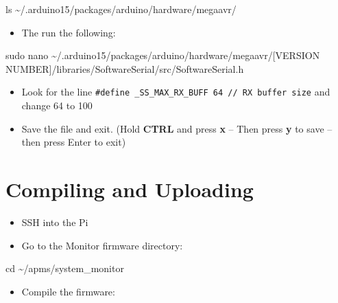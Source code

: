 \documentclass[
  letterpaper,
]{scrbook}
\newenvironment{Shaded}{\begin{snugshade}}{\end{snugshade}}
\newcommand{\BuiltInTok}[1]{\textcolor[rgb]{0.00,0.23,0.31}{#1}}
\newcommand{\FunctionTok}[1]{\textcolor[rgb]{0.28,0.35,0.67}{#1}}
\newcommand{\NormalTok}[1]{\textcolor[rgb]{0.00,0.23,0.31}{#1}}
\providecommand{\tightlist}{%
  \setlength{\itemsep}{0pt}\setlength{\parskip}{0pt}}
\begin{document}
\begin{Shaded}
\begin{Highlighting}[]
\FunctionTok{ls}\NormalTok{ \textasciitilde{}/.arduino15/packages/arduino/hardware/megaavr/}
\end{Highlighting}
\end{Shaded}

\begin{itemize}
\tightlist
\item
  The run the following:
\end{itemize}

\begin{Shaded}
\begin{Highlighting}[]
\FunctionTok{sudo}\NormalTok{ nano \textasciitilde{}/.arduino15/packages/arduino/hardware/megaavr/[VERSION NUMBER]/libraries/SoftwareSerial/src/SoftwareSerial.h}
\end{Highlighting}
\end{Shaded}

\begin{itemize}
\item
  Look for the line
  \texttt{\#define\ \_SS\_MAX\_RX\_BUFF\ 64\ //\ RX\ buffer\ size} and
  change 64 to 100
\item
  Save the file and exit. (Hold \textbf{CTRL} and press \textbf{x} --
  Then press \textbf{y} to save -- then press Enter to exit)
\end{itemize}

\section{Compiling and Uploading}\label{compiling-and-uploading}

\begin{itemize}
\item
  SSH into the Pi
\item
  Go to the Monitor firmware directory:
\end{itemize}

\begin{Shaded}
\begin{Highlighting}[]
\BuiltInTok{cd}\NormalTok{ \textasciitilde{}/apms/system\_monitor}
\end{Highlighting}
\end{Shaded}

\begin{itemize}
\tightlist
\item
  Compile the firmware:
\end{itemize}
\end{document}

